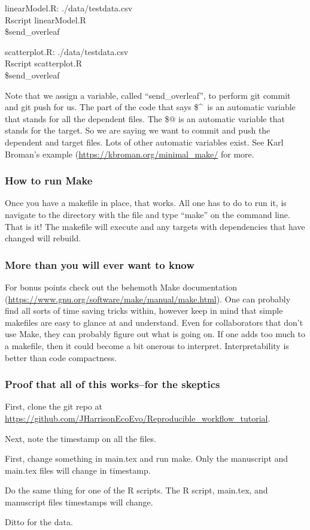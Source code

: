 \documentclass{article}
\begin{document}
linearModel.R: ./data/testdata.csv\\
\tab Rscript linearModel.R\\
\tab \${send\_overleaf}

scatterplot.R: ./data/testdata.csv\\
\tab Rscript scatterplot.R\\
\tab \${send\_overleaf}

Note that we assign a variable, called ``send\_overleaf'', to perform git commit and git push for us. The part of the code that says \$\textasciicircum\ is an automatic variable that stands for all the dependent files. The \$$@$ is an automatic variable that stands for the target. So we are saying we want to commit and push the dependent and target files. Lots of other automatic variables exist. See Karl Broman's example (\url{https://kbroman.org/minimal_make/} for more.

\subsubsection{How to run {\sf Make}}

Once you have a makefile in place, that works. All one has to do to run it, is navigate to the directory with the file and type ``make'' on the command line. That is it! The makefile will execute and any targets with dependencies that have changed will rebuild. 

\subsubsection{More than you will ever want to know}

For bonus points check out the behemoth {\sf Make} documentation (\url{https://www.gnu.org/software/make/manual/make.html}). One can probably find all sorts of time saving tricks within, however keep in mind that simple makefiles are easy to glance at and understand. Even for collaborators that don't use {\sf Make}, they can probably figure out what is going on. If one adds too much to a makefile, then it could become a bit onerous to interpret. Interpretability is better than code compactness.

\subsubsection{Proof that all of this works--for the skeptics}

First, clone the {\sf git} repo at \url{https://github.com/JHarrisonEcoEvo/Reproducible_workflow_tutorial}.

Next, note the timestamp on all the files. 

First, change something in main.tex and run make. Only the manuscript and main.tex files will change in timestamp. 

Do the same thing for one of the R scripts. The R script, main.tex, and manuscript files timestamps will change. 

Ditto for the data. 
\end{document}
